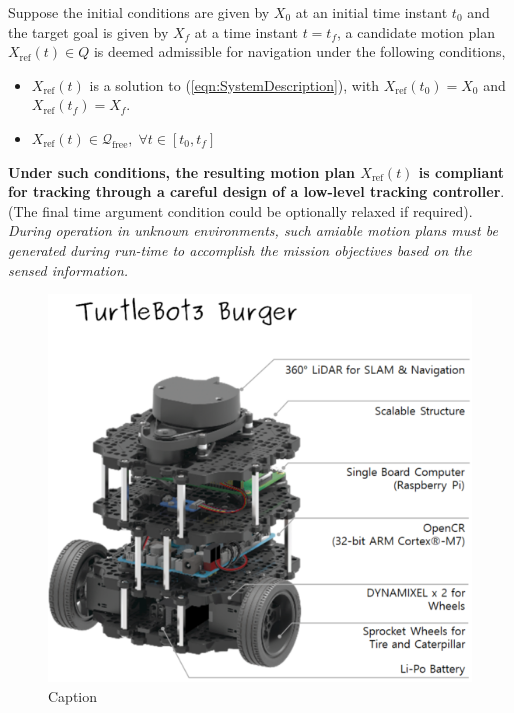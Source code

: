 \documentclass{article}
\begin{document}
Suppose the initial conditions are given by $X_0$ at an initial time instant $t_0$ and the target goal is given by $X_f$ at a time instant $t=t_f$, a candidate motion plan $X_{\text{ref}}(t) \in Q$ is deemed admissible for navigation under the following conditions,
\begin{itemize}
    \item $X_{\text{ref}}(t)$ is a solution to (\ref{eqn:SystemDescription}), with $X_{\text{ref}}(t_0) = X_0$ and $X_{\text{ref}}(t_f) = X_f$.
    \item $X_{\text{ref}}(t) \in \mathcal{Q}_{\text{free}},\; \forall t\in[t_0,t_f]$  
\end{itemize}
\textbf{Under such conditions, the resulting motion plan $X_{\text{ref}}(t)$ is compliant for tracking through a careful design of a low-level tracking controller}. (The final time argument condition could be optionally relaxed if required). \textit{During operation in unknown environments, such amiable motion plans must be generated during run-time to accomplish the mission objectives based on the sensed information.}
\begin{figure}
    \centering
    \includegraphics[width = 8 cm]{src/media/turtlebot3_burger_components.png}
    \caption{Caption}
    \label{fig:enter-label}
\end{figure}
\end{document}
